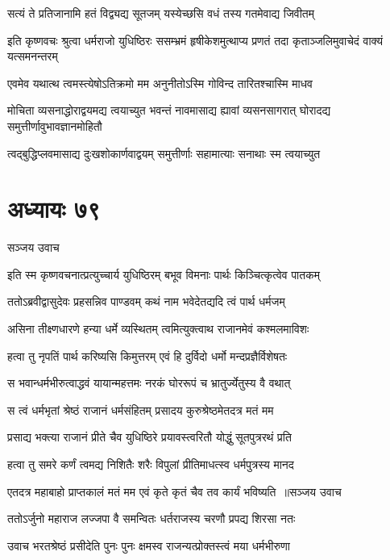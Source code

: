 \twolineshloka
{सत्यं ते प्रतिजानामि हतं विद्व्यद्य सूतजम्}
{यस्येच्छसि वधं तस्य गतमेवाद्य जिवीतम्}


\threelineshloka
{इति कृष्णवचः श्रुत्वा धर्मराजो युधिष्ठिरः}
{ससम्भ्रमं हृषीकेशमुत्थाप्य प्रणतं तदा}
{कृताञ्जलिमुवाचेदं वाक्यं यत्समनन्तरम्}


\twolineshloka
{एवमेव यथात्थ त्वमस्त्येषोऽतिक्रमो मम}
{अनुनीतोऽस्मि गोविन्द तारितश्चास्मि माधव}


\threelineshloka
{मोचिता व्यसनाद्धोराद्वयमद्य त्वयाच्युत}
{भवन्तं नावमासाद्य ह्यावां व्यसनसागरात्}
{घोरादद्य समुत्तीर्णावुभावज्ञानमोहितौ}


\twolineshloka
{त्वद्बुद्धिप्लवमासाद्य दुःखशोकार्णवाद्वयम्}
{समुत्तीर्णाः सहामात्याः सनाथाः स्म त्वयाच्युत}


\chapter{अध्यायः ७९}
\twolineshloka
{सञ्जय उवाच}
{}


\twolineshloka
{इति स्म कृष्णवचनात्प्रत्युच्चार्य युधिष्ठिरम्}
{बभूव विमनाः पार्थः किञ्चित्कृत्वेव पातकम्}


\twolineshloka
{ततोऽब्रवीद्वासुदेवः प्रहसन्निव पाण्डवम्}
{कथं नाम भवेदेतद्यदि त्वं पार्थ धर्मजम्}


\twolineshloka
{असिना तीक्ष्णधारणे हन्या धर्मे व्यस्थितम्}
{त्वमित्युक्त्वाथ राजानमेवं कश्मलमाविशः}


\twolineshloka
{हत्वा तु नृपतिं पार्थ करिष्यसि किमुत्तरम्}
{एवं हि दुर्विदो धर्मो मन्दप्रज्ञैर्विशेषतः}


\twolineshloka
{स भवान्धर्मभीरुत्वाद्धवं यायान्महत्तमः}
{नरकं घोररूपं च भ्रातुर्ज्येतुस्य वै वथात्}


\twolineshloka
{स त्वं धर्मभृतां श्रेष्ठं राजानं धर्मसंहितम्}
{प्रसादय कुरुश्रेष्ठमेतदत्र मतं मम}


\twolineshloka
{प्रसाद्य भक्त्या राजानं प्रीते चैव युधिष्ठिरे}
{प्रयावस्त्वरितौ योद्धुं सूतपुत्ररथं प्रति}


\twolineshloka
{हत्वा तु समरे कर्णं त्वमद्य निशितैः शरैः}
{विपुलां प्रीतिमाधत्स्व धर्मपुत्रस्य मानद}


\threelineshloka
{एतदत्र महाबाहो प्राप्तकालं मतं मम}
{एवं कृते कृतं चैव तव कार्यं भविष्यति ॥सञ्जय उवाच}
{}


\twolineshloka
{ततोऽर्जुनो महाराज लज्जपा वै समन्वितः}
{धर्तराजस्य चरणौ प्रपद्य शिरसा नतः}


\twolineshloka
{उवाच भरतश्रेष्ठं प्रसीदेति पुनः पुनः}
{क्षमस्व राजन्यत्प्रोक्तस्त्वं मया धर्मभीरुणा}


